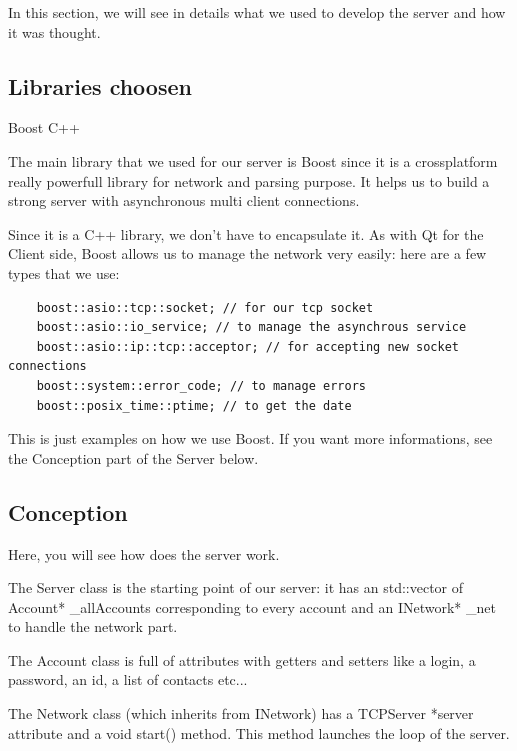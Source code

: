 \documentclass{article}
\begin{document}
  In this section, we will see in details what we used to develop the server and how it was thought.

  \subsection{Libraries choosen}

  \bigskip
  Boost C++
  \bigskip

  The main library that we used for our server is Boost since it is a crossplatform really powerfull library for network and parsing purpose. It helps us to build a strong server with asynchronous multi client connections.

  \bigskip
  Since it is a C++ library, we don't have to encapsulate it. As with Qt for the Client side, Boost allows us to manage the network very easily: here are a few types that we use:
  \bigskip

  \begin{lstlisting}
    boost::asio::tcp::socket; // for our tcp socket
    boost::asio::io_service; // to manage the asynchrous service
    boost::asio::ip::tcp::acceptor; // for accepting new socket connections
    boost::system::error_code; // to manage errors
    boost::posix_time::ptime; // to get the date
  \end{lstlisting}

  \bigskip
  This is just examples on how we use Boost. If you want more informations, see the Conception part of the Server below.

  \newpage

  \subsection{Conception}

  Here, you will see how does the server work.

  \bigskip

  The Server class is the starting point of our server: it has an std::vector of Account* \_allAccounts corresponding to every account and an INetwork* \_net to handle the network part.

  \bigskip
  The Account class is full of attributes with getters and setters like a login, a password, an id, a list of contacts etc...

  \bigskip
  The Network class (which inherits from INetwork) has a TCPServer *server attribute and a void start() method. This method launches the loop of the server.
\end{document}
